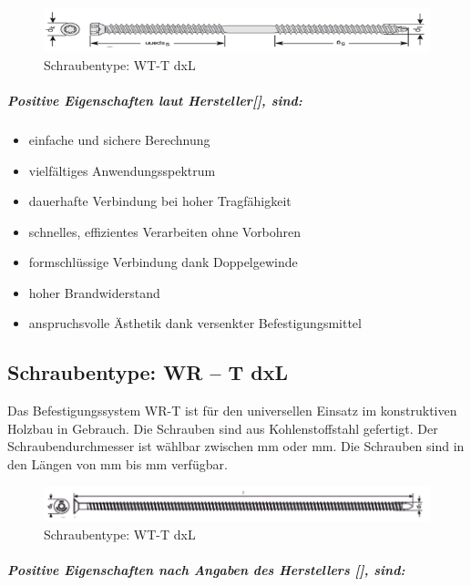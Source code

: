 \begin{figure}[h]
\begin{center}
\includegraphics[scale =0.7]{Verbindungsmittel/schrauben/WT-TdxL.png}
\caption{Schraubentype: WT-T dxL}
\end{center}
\end{figure}

\subparagraph{Positive Eigenschaften laut Hersteller[], sind:}

\begin{itemize}
	\item einfache und sichere Berechnung
	\item vielfältiges Anwendungsspektrum
	\item dauerhafte Verbindung  bei hoher Tragfähigkeit
	\item schnelles, effizientes Verarbeiten ohne Vorbohren
	\item formschlüssige Verbindung  dank Doppelgewinde
	\item hoher Brandwiderstand
	\item anspruchsvolle Ästhetik dank versenkter Befestigungsmittel
	
\end{itemize}

\subsection{Schraubentype:	 WR – T  dxL}
Das Befestigungssystem WR-T ist für den universellen Einsatz im konstruktiven Holzbau in Gebrauch. Die Schrauben sind aus Kohlenstoffstahl gefertigt. Der Schraubendurchmesser ist wählbar zwischen \unit[9]{mm} oder \unit[13]{mm}. Die Schrauben sind in den Längen von  \unit[250]{mm} bis \unit[1000]{mm} verfügbar. 

\begin{figure}[h]
\begin{center}
\includegraphics[scale =0.7]{Verbindungsmittel/schrauben/WR-TdxL.png}
\caption{Schraubentype: WT-T dxL}
\end{center}
\end{figure}

\subparagraph{Positive Eigenschaften nach Angaben des Herstellers [], sind:}

